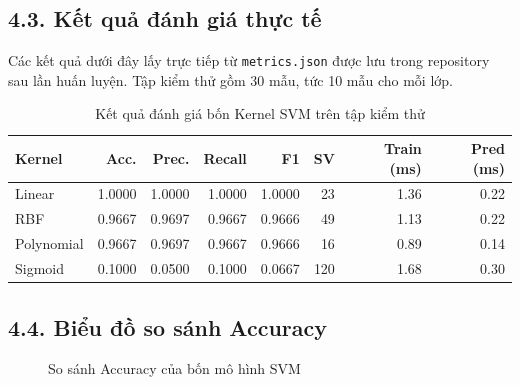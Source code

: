\documentclass{article}
\begin{document}
	\subsection{4.3. Kết quả đánh giá thực tế}
	\hspace{0.5cm}
	Các kết quả dưới đây lấy trực tiếp từ \texttt{metrics.json} được lưu trong repository sau lần huấn luyện. Tập kiểm thử gồm 30 mẫu, tức 10 mẫu cho mỗi lớp.
	
	\begin{table}[H]
		\centering
		\caption{Kết quả đánh giá bốn Kernel SVM trên tập kiểm thử}
		\label{tab:metrics}
		\small
		\begin{tabular}{lrrrrrrr}
			\toprule
			\textbf{Kernel} & \textbf{Acc.} & \textbf{Prec.} & \textbf{Recall} & \textbf{F1} & \textbf{SV} & \textbf{Train (ms)} & \textbf{Pred (ms)}\\
			\midrule
			Linear & 1.0000 & 1.0000 & 1.0000 & 1.0000 & 23 & 1.36 & 0.22\\
			RBF & 0.9667 & 0.9697 & 0.9667 & 0.9666 & 49 & 1.13 & 0.22\\
			Polynomial & 0.9667 & 0.9697 & 0.9667 & 0.9666 & 16 & 0.89 & 0.14\\
			Sigmoid & 0.1000 & 0.0500 & 0.1000 & 0.0667 & 120 & 1.68 & 0.30\\
			\bottomrule
		\end{tabular}
	\end{table}
	
	\subsection{4.4. Biểu đồ so sánh Accuracy}
	
	\begin{figure}[H]
		\centering
		\caption{So sánh Accuracy của bốn mô hình SVM}
		\label{fig:accuracy}
	\end{figure}
	
\end{document}
